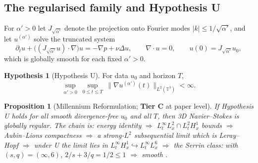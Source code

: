 \documentclass[11pt,a4paper]{article}
\newcommand{\tC}{\textcolor{TierC}{\textbf{Tier C}}}
\newcommand{\T}{\mathbb{T}}
\theoremstyle{definition}
\newtheorem{hypothesis}{Hypothesis}
\theoremstyle{plain}
\newtheorem{proposition}[theorem]{Proposition}
\begin{document}
\subsection{The regularised family and Hypothesis U}

For $\alpha'>0$ let $J_{\sqrt{\alpha'}}$ denote the projection onto Fourier modes
$|k|\le 1/\sqrt{\alpha'}$, and let $u^{(\alpha')}$ solve the truncated system
\begin{equation}
\partial_t u + \bigl((J_{\sqrt{\alpha'}}u)\cdot\nabla\bigr)u = -\nabla p + \nu\Delta u,
\qquad \nabla\cdot u=0,\qquad u(0)=J_{\sqrt{\alpha'}}u_0 ,
\label{eq:truncated}
\end{equation}
which is globally smooth for each fixed $\alpha'>0$.

\begin{hypothesis}[Hypothesis U]
For data $u_0$ and horizon $T$,
\begin{equation}
\sup_{\alpha'>0}\ \sup_{0\le t\le T}\ \bigl\|\nabla u^{(\alpha')}(t)\bigr\|_{L^2(\T^3)} < \infty .
\label{eq:hypU}
\end{equation}
\end{hypothesis}

\begin{proposition}[Millennium Reformulation; \tC{} at paper level]
\label{prop:millennium}
If Hypothesis U holds for all smooth divergence-free $u_0$ and all $T$, then 3D
Navier--Stokes is globally regular. The chain is: energy identity $\Rightarrow$
$L^\infty_tL^2_x\cap L^2_tH^1_x$ bounds $\Rightarrow$ Aubin--Lions compactness $\Rightarrow$
a strong-$L^2$ subsequential limit which is Leray--Hopf $\Rightarrow$ under U the limit lies
in $L^\infty_tH^1_x\hookrightarrow L^\infty_tL^6_x$ $\Rightarrow$ the Serrin class: with
$(s,q)=(\infty,6)$, $2/s+3/q=1/2\le1$ $\Rightarrow$ smooth \cite{prodi-serrin-modern}.
\end{proposition}
\end{document}
